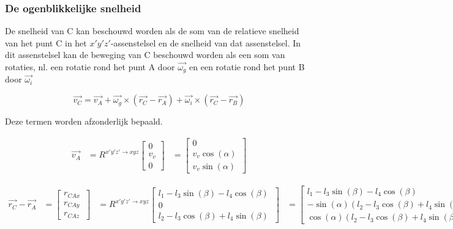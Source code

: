 \subsubsection{De ogenblikkelijke snelheid}
De snelheid van C kan beschouwd worden als de som van de relatieve snelheid van het punt C in het $x'y'z'$-assenstelsel en de snelheid van dat assenstelsel. In dit assenstelsel kan de beweging van C beschouwd worden als een som van rotaties, nl. een rotatie rond het punt A door $\overrightarrow{\omega_{g}}$ en een rotatie rond het punt B door $\overrightarrow{\omega_{i}}$

\begin{equation*}
\overrightarrow{v_{C}}=\overrightarrow{v_{A}}+\overrightarrow{\omega_{g}}\times(\overrightarrow{r_{C}}-\overrightarrow{r_{A}})+\overrightarrow{\omega_{i}}\times(\overrightarrow{r_{C}}-\overrightarrow{r_{B}})
\end{equation*}

Deze termen worden afzonderlijk bepaald.

\begin{equation*}
\begin{split}
\overrightarrow{v_{A}}
&=R^{x'y'z' \rightarrow xyz}
	\begin{bmatrix}
	0\\
	v_v\\
	0
	\end{bmatrix}
&=	\begin{bmatrix}
0\\
v_v\cos(\alpha)\\
v_v\sin(\alpha)\
\end{bmatrix}
\end{split}
\end{equation*}

\begin{equation*}
\begin{split}
\overrightarrow{r_{C}}-\overrightarrow{r_{A}}
&=\begin{bmatrix}
r_{CAx}\\
r_{CAy}\\
r_{CAz}\
\end{bmatrix}
&=R^{x'y'z' \rightarrow xyz}
	\begin{bmatrix}
	l_{1}-l_{3}\sin(\beta)-l_{4}\cos(\beta)\\
	0\\
	l_{2}-l_{3}\cos(\beta)+l_{4}\sin(\beta)\
	\end{bmatrix}
&=	\begin{bmatrix}
	l_{1}-l_{3}\sin(\beta)-l_{4}\cos(\beta)\\
	-\sin(\alpha)(l_{2}-l_{3}\cos(\beta)+l_{4}\sin(\beta))\\
	\cos(\alpha)(l_{2}-l_{3}\cos(\beta)+l_{4}\sin(\beta))\
	\end{bmatrix}
\end{split}
\end{equation*}

